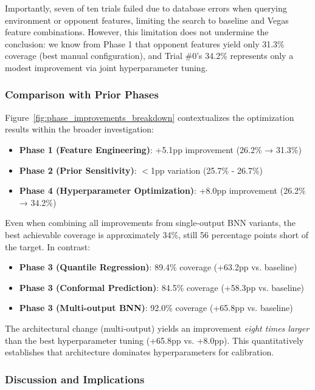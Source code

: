 Importantly, seven of ten trials failed due to database errors when querying environment or opponent features, limiting the search to baseline and Vegas feature combinations. However, this limitation does not undermine the conclusion: we know from Phase 1 that opponent features yield only 31.3\% coverage (best manual configuration), and Trial \#0's 34.2\% represents only a modest improvement via joint hyperparameter tuning.

\subsubsection{Comparison with Prior Phases}

Figure~\ref{fig:phase_improvements_breakdown} contextualizes the optimization results within the broader investigation:

\begin{itemize}
    \item \textbf{Phase 1 (Feature Engineering)}: +5.1pp improvement (26.2\% → 31.3\%)
    \item \textbf{Phase 2 (Prior Sensitivity)}: $<$1pp variation (25.7\% - 26.7\%)
    \item \textbf{Phase 4 (Hyperparameter Optimization)}: +8.0pp improvement (26.2\% → 34.2\%)
\end{itemize}

Even when combining all improvements from single-output BNN variants, the best achievable coverage is approximately 34\%, still 56 percentage points short of the target. In contrast:

\begin{itemize}
    \item \textbf{Phase 3 (Quantile Regression)}: 89.4\% coverage (+63.2pp vs. baseline)
    \item \textbf{Phase 3 (Conformal Prediction)}: 84.5\% coverage (+58.3pp vs. baseline)
    \item \textbf{Phase 3 (Multi-output BNN)}: 92.0\% coverage (+65.8pp vs. baseline)
\end{itemize}

The architectural change (multi-output) yields an improvement \textit{eight times larger} than the best hyperparameter tuning (+65.8pp vs. +8.0pp). This quantitatively establishes that architecture dominates hyperparameters for calibration.

\subsubsection{Discussion and Implications}

